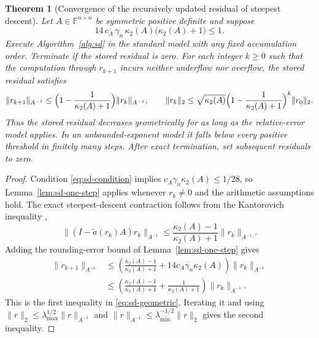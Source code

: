 \documentclass[11pt]{article}
\newtheorem{theorem}{Theorem}
\theoremstyle{definition}
\begin{document}
\begin{theorem}[Convergence of the recursively updated residual of steepest descent]
\label{thm:sd-positive}
Let $A\in\mathbb F^{n\times n}$ be symmetric positive definite and suppose
\begin{equation}
 14\,c_A\,\gamma_n\,\kappa_2(A)\bigl(\kappa_2(A)+1\bigr)\le1 .
 \label{eq:sd-condition}
\end{equation}
Execute Algorithm~\ref{alg:sd} in the standard model with any fixed
accumulation order. Terminate if the stored residual is zero.
For each integer $k\ge0$ such that the computation through $r_{k+1}$
incurs neither underflow nor overflow, the stored residual satisfies
\begin{equation}
 \|r_{k+1}\|_{A^{-1}}\le\Bigl(1-\frac1{\kappa_2(A)+1}\Bigr)\|r_k\|_{A^{-1}},
 \qquad
 \|r_k\|_2\le\sqrt{\kappa_2(A)}\Bigl(1-\frac1{\kappa_2(A)+1}\Bigr)^k\|r_0\|_2 .
 \label{eq:sd-geometric}
\end{equation}
Thus the stored residual decreases geometrically for as long as the
relative-error model applies.  In an unbounded-exponent model it falls
below every positive threshold in finitely many steps.  After exact
termination, set subsequent residuals to zero.
\end{theorem}

\begin{proof}
Condition \eqref{eq:sd-condition} implies
$c_A\gamma_n\kappa_2(A)\le1/28$, so
Lemma~\ref{lem:sd-one-step} applies whenever $r_k\ne0$ and the arithmetic
assumptions hold. The exact steepest-descent contraction follows from the
Kantorovich inequality \cite[Sec.~5.3]{Saad2003},
\[
 \|(I-\tilde a(r_k)A)r_k\|_{A^{-1}}
 \le\frac{\kappa_2(A)-1}{\kappa_2(A)+1}\|r_k\|_{A^{-1}}.
\]
Adding the rounding-error bound of Lemma~\ref{lem:sd-one-step} gives
\[
\begin{aligned}
 \|r_{k+1}\|_{A^{-1}}
 &\le\left(\frac{\kappa_2(A)-1}{\kappa_2(A)+1}
           +14c_A\gamma_n\kappa_2(A)\right)\|r_k\|_{A^{-1}}\\
 &\le\left(\frac{\kappa_2(A)-1}{\kappa_2(A)+1}
           +\frac1{\kappa_2(A)+1}\right)\|r_k\|_{A^{-1}}.
\end{aligned}
\]
This is the first inequality in \eqref{eq:sd-geometric}.
Iterating it and using
$\|r\|_2\le\lambda_{\max}^{1/2}\|r\|_{A^{-1}}$ and
$\|r\|_{A^{-1}}\le\lambda_{\min}^{-1/2}\|r\|_2$
gives the second inequality.
\end{proof}
\end{document}
